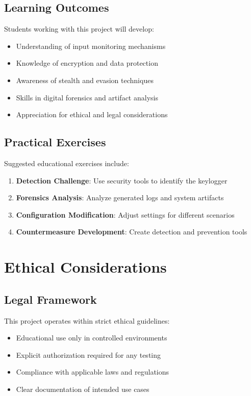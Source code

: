 \documentclass[12pt,a4paper]{article}
\begin{document}
\subsection{Learning Outcomes}

Students working with this project will develop:

\begin{itemize}
    \item Understanding of input monitoring mechanisms
    \item Knowledge of encryption and data protection
    \item Awareness of stealth and evasion techniques
    \item Skills in digital forensics and artifact analysis
    \item Appreciation for ethical and legal considerations
\end{itemize}

\subsection{Practical Exercises}

Suggested educational exercises include:

\begin{enumerate}
    \item \textbf{Detection Challenge}: Use security tools to identify the keylogger
    \item \textbf{Forensics Analysis}: Analyze generated logs and system artifacts
    \item \textbf{Configuration Modification}: Adjust settings for different scenarios
    \item \textbf{Countermeasure Development}: Create detection and prevention tools
\end{enumerate}

\section{Ethical Considerations}

\subsection{Legal Framework}

This project operates within strict ethical guidelines:

\begin{itemize}
    \item Educational use only in controlled environments
    \item Explicit authorization required for any testing
    \item Compliance with applicable laws and regulations
    \item Clear documentation of intended use cases
\end{itemize}
\end{document}
